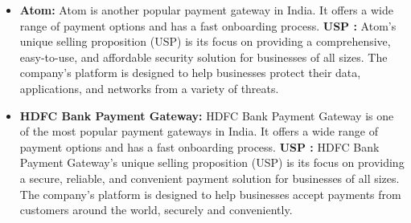 \begin{enumerate}
\begin{itemize}
    \item \textbf{Atom:} Atom is another popular payment gateway in India. It offers a wide range of payment options and has a fast onboarding process.
    \textbf{USP : }Atom's unique selling proposition (USP) is its focus on providing a comprehensive, easy-to-use, and affordable security solution for businesses of all sizes. The company's platform is designed to help businesses protect their data, applications, and networks from a variety of threats.


    \item \textbf{HDFC Bank Payment Gateway:} HDFC Bank Payment Gateway is one of the most popular payment gateways in India. It offers a wide range of payment options and has a fast onboarding process.
    \textbf{USP : }HDFC Bank Payment Gateway's unique selling proposition (USP) is its focus on providing a secure, reliable, and convenient payment solution for businesses of all sizes. The company's platform is designed to help businesses accept payments from customers around the world, securely and conveniently.



\end{itemize}
\end{enumerate}
